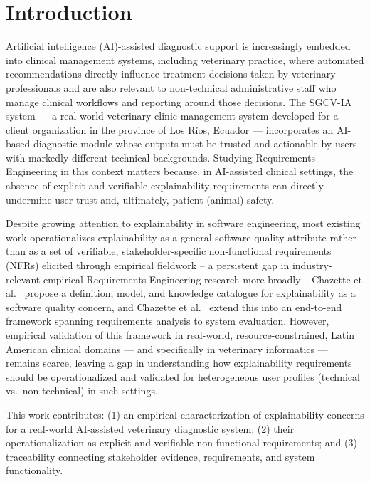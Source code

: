 \documentclass[pdflatex,sn-mathphys-num,Numbered]{sn-jnl}
\begin{document}
\section{Introduction}\label{sec1}

Artificial intelligence (AI)-assisted diagnostic support is increasingly embedded into clinical management systems, including veterinary practice, where automated recommendations directly influence treatment decisions taken by veterinary professionals and are also relevant to non-technical administrative staff who manage clinical workflows and reporting around those decisions. The SGCV-IA system --- a real-world veterinary clinic management system developed for a client organization in the province of Los R\'ios, Ecuador --- incorporates an AI-based diagnostic module whose outputs must be trusted and actionable by users with markedly different technical backgrounds. Studying Requirements Engineering in this context matters because, in AI-assisted clinical settings, the absence of explicit and verifiable explainability requirements can directly undermine user trust and, ultimately, patient (animal) safety.

Despite growing attention to explainability in software engineering, most existing work operationalizes explainability as a general software quality attribute rather than as a set of verifiable, stakeholder-specific non-functional requirements (NFRs) elicited through empirical fieldwork -- a persistent gap in industry-relevant empirical Requirements Engineering research more broadly~\cite{fernandez2018}. Chazette et al.~\cite{chazette2021} propose a definition, model, and knowledge catalogue for explainability as a software quality concern, and Chazette et al.~\cite{chazette2022} extend this into an end-to-end framework spanning requirements analysis to system evaluation. However, empirical validation of this framework in real-world, resource-constrained, Latin American clinical domains --- and specifically in veterinary informatics --- remains scarce, leaving a gap in understanding how explainability requirements should be operationalized and validated for heterogeneous user profiles (technical vs.\ non-technical) in such settings.

This work contributes: (1) an empirical characterization of explainability concerns for a real-world AI-assisted veterinary diagnostic system; (2) their operationalization as explicit and verifiable non-functional requirements; and (3) traceability connecting stakeholder evidence, requirements, and system functionality.
\end{document}
